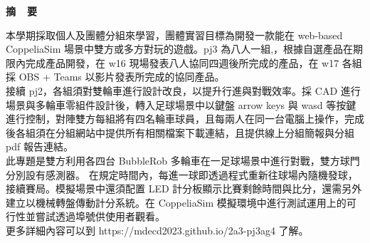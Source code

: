 \renewcommand{\baselinestretch}{1.5} %
\clearpage  %
\sectionef
{} %
\begin{center}
\LARGE\textbf{摘~~要}\\
\end{center}
\begin{flushleft}
\fontsize{14pt}{20pt}\sectionef\hspace{12pt}\quad 本學期採取個人及團體分組來學習，團體實習目標為開發一款能在 web-based CoppeliaSim 場景中雙方或多方對玩的遊戲。pj3 為八人一組,，根據自選產品在期限內完成產品開發，在 w16 現場發表八人協同四週後所完成的產品，在 w17 各組採 OBS + Teams 以影片發表所完成的協同產品。\\[12pt]
\fontsize{14pt}{20pt}\sectionef\hspace{12pt}\quad  接續 pj2，各組須對雙輪車進行設計改良，以提升行進與對戰效率。採 CAD 進行場景與多輪車零組件設計後，轉入足球場景中以鍵盤 arrow keys 與 wasd 等按鍵進行控制，對陣雙方每組將有四名輪車球員，且每兩人在同一台電腦上操作，完成後各組須在分組網站中提供所有相關檔案下載連結，且提供線上分組簡報與分組 pdf 報告連結。\\[12pt]	
\fontsize{14pt}{20pt}\sectionef\hspace{12pt}\quad 此專題是雙方利用各四台 BubbleRob 多輪車在一足球場景中進行對戰，雙方球門分別設有感測器。 在規定時間內，每進一球即透過程式重新往球場內隨機發球，接續賽局。模擬場景中還須配置 LED 計分板顯示比賽剩餘時間與比分，還需另外建立以機械轉盤傳動計分系統。在 CoppeliaSim 模擬環境中進行測試運用上的可行性並嘗試透過埠號供使用者觀看。\\
  更多詳細內容可以到 https://mdecd2023.github.io/2a3-pj3ag4 了解。\\[10pt]

\end{flushleft}
\newpage
\renewcommand{\baselinestretch}{1.5} %
